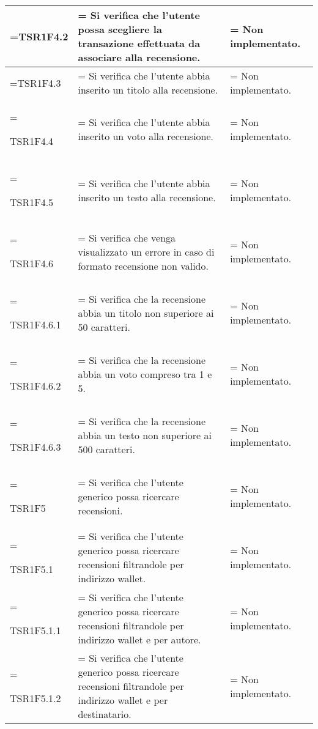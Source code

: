 \begin{xltabular}{\textwidth} {
            >{\hsize\linewidth=\hsize}X
            >{\hsize\linewidth=\hsize}X
            >{\hsize\linewidth=\hsize}X
        }
        TSR1F4.2&
        Si verifica che l'utente possa scegliere la transazione effettuata da associare alla recensione.&
        Non implementato.
        \\ \hline

        TSR1F4.3&
        Si verifica che l'utente abbia inserito un titolo alla recensione.&
        Non implementato.
        \\ \hline

        TSR1F4.4&
        Si verifica che l'utente abbia inserito un voto alla recensione.&
        Non implementato.
        \\ \hline

        TSR1F4.5&
        Si verifica che l'utente abbia inserito un testo alla recensione.&
        Non implementato.
        \\ \hline

        TSR1F4.6&
        Si verifica che venga visualizzato un errore in caso di formato recensione non valido.&
        Non implementato.
        \\ \hline
        
        TSR1F4.6.1&
        Si verifica che la recensione abbia un titolo non superiore ai 50 caratteri.&
        Non implementato.
        \\ \hline

        TSR1F4.6.2&
        Si verifica che la recensione abbia un voto compreso tra 1 e 5.&
        Non implementato.
        \\ \hline

        TSR1F4.6.3&
        Si verifica che la recensione abbia un testo non superiore ai 500 caratteri.&
        Non implementato.
        \\ \hline

        TSR1F5&
        Si verifica che l'utente generico possa ricercare recensioni.&
        Non implementato.
        \\ \hline

        TSR1F5.1&
        Si verifica che l'utente generico possa ricercare recensioni filtrandole per indirizzo wallet.&
        Non implementato.
        \\ \hline
        
        TSR1F5.1.1&
        Si verifica che l'utente generico possa ricercare recensioni filtrandole per indirizzo wallet e per autore.&
        Non implementato.
        \\ \hline
        
        TSR1F5.1.2&
        Si verifica che l'utente generico possa ricercare recensioni filtrandole per indirizzo wallet e per destinatario.&
        Non implementato.
        \\ \hline


\end{xltabular}
